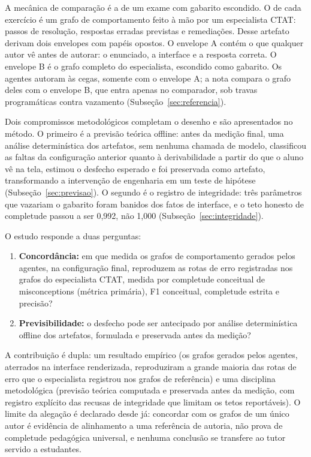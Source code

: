 \documentclass[11pt,a4paper]{article}
\begin{document}
A mecânica de comparação é a de um exame com gabarito escondido. O  de cada exercício é um grafo de comportamento feito à mão por um especialista CTAT: passos de resolução, respostas erradas previstas e remediações. Desse artefato derivam dois envelopes com papéis opostos. O envelope A contém o que qualquer autor vê antes de autorar: o enunciado, a interface e a resposta correta. O envelope B é o grafo completo do especialista, escondido como gabarito. Os agentes autoram às cegas, somente com o envelope A; a nota compara o grafo deles com o envelope B, que entra apenas no comparador, sob travas programáticas contra vazamento (Subseção~\ref{sec:referencia}).

Dois compromissos metodológicos completam o desenho e são apresentados no método. O primeiro é a previsão teórica offline: antes da medição final, uma análise determinística dos artefatos, sem nenhuma chamada de modelo, classificou as faltas da configuração anterior quanto à derivabilidade a partir do que o aluno vê na tela, estimou o desfecho esperado e foi preservada como artefato, transformando a intervenção de engenharia em um teste de hipótese (Subseção~\ref{sec:previsao}). O segundo é o registro de integridade: três parâmetros que vazariam o gabarito foram banidos dos fatos de interface, e o teto honesto de completude passou a ser 0,992, não 1,000 (Subseção~\ref{sec:integridade}).

O estudo responde a duas perguntas:

\begin{enumerate}[label=\textbf{QP\arabic*.}]
  \item \textbf{Concordância:} em que medida os grafos de comportamento gerados pelos agentes, na configuração final, reproduzem as rotas de erro registradas nos grafos do especialista CTAT, medida por completude conceitual de misconceptions (métrica primária), F1 conceitual, completude estrita e precisão?
  \item \textbf{Previsibilidade:} o desfecho pode ser antecipado por análise determinística offline dos artefatos, formulada e preservada antes da medição?
\end{enumerate}

A contribuição é dupla: um resultado empírico (os grafos gerados pelos agentes, aterrados na interface renderizada, reproduziram a grande maioria das rotas de erro que o especialista registrou nos grafos de referência) e uma disciplina metodológica (previsão teórica computada e preservada antes da medição, com registro explícito das recusas de integridade que limitam os tetos reportáveis). O limite da alegação é declarado desde já: concordar com os grafos de um único autor é evidência de alinhamento a uma referência de autoria, não prova de completude pedagógica universal, e nenhuma conclusão se transfere ao tutor servido a estudantes.
\end{document}
